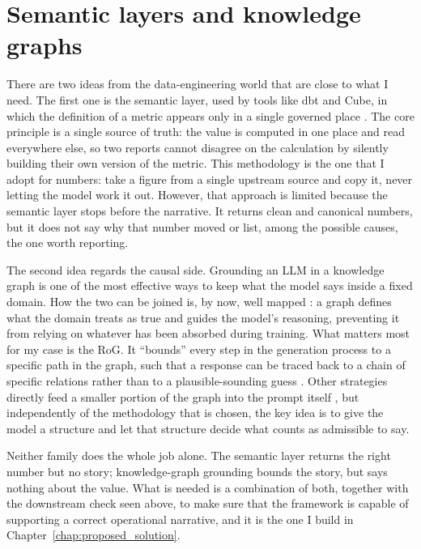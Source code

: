 \documentclass[12pt,a4paper,openright,twoside]{book}
\begin{document}
\section{Semantic layers and knowledge graphs}
There are two ideas from the data-engineering world that are close to what I need. 
The first one is the semantic layer, used by tools like \ac{dbt} and Cube, in which the definition of a metric appears only in a single governed place \cite{dbt2024semantic, cube2024semantic}.
The core principle is a single source of truth: the value is computed in one place and read everywhere else, so two reports cannot disagree on the calculation by silently building their own version of the metric.
This methodology is the one that I adopt for numbers: take a figure from a single upstream source and copy it, never letting the model work it out.
However, that approach is limited because the semantic layer stops before the narrative. It returns clean and canonical numbers, but it does not say why that number moved or list, among the possible causes, the one worth reporting.

The second idea regards the causal side. Grounding an \ac{LLM} in a knowledge graph is one of the most effective ways to keep what the model says inside a fixed domain.
How the two can be joined is, by now, well mapped \cite{pan2024llmkg}: a graph defines what the domain treats as true and guides the model's reasoning, preventing it from relying on whatever has been absorbed during training.
What matters most for my case is the \ac{RoG}. It \enquote{bounds} every step in the generation process to a specific path in the graph, such that a response can be traced back to a chain of specific relations rather than to a plausible-sounding guess \cite{luo2024rog}.
Other strategies directly feed a smaller portion of the graph into the prompt itself \cite{baek2023knowledgeaugmented}, but independently of the methodology that is chosen, the key idea is to give the model a structure and let that structure decide what counts as admissible to say.

Neither family does the whole job alone.
The semantic layer returns the right number but no story; knowledge-graph grounding bounds the story, but says nothing about the value.
What is needed is a combination of both, together with the downstream check seen above, to make sure that the framework is capable of supporting a correct operational narrative, and it is the one I build in Chapter~\ref{chap:proposed_solution}.
\end{document}
